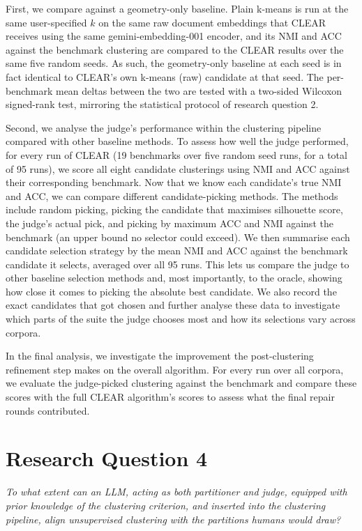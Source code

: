 \documentclass[11pt,a4paper,oneside]{report}
\begin{document}
First, we compare against a geometry-only baseline. Plain k-means is run at the same user-specified $k$ on the same raw document embeddings that CLEAR receives using the same {\small\ttfamily gemini-embedding-001} encoder, and its NMI and ACC against the benchmark clustering are compared to the CLEAR results over the same five random seeds. As such, the geometry-only baseline at each seed is in fact identical to CLEAR's own k-means (raw) candidate at that seed. The per-benchmark mean deltas between the two are tested with a two-sided Wilcoxon signed-rank test, mirroring the statistical protocol of research question 2.

Second, we analyse the judge's performance within the clustering pipeline compared with other baseline methods. To assess how well the judge performed, for every run of CLEAR (19 benchmarks over five random seed runs, for a total of 95 runs), we score all eight candidate clusterings using NMI and ACC against their corresponding benchmark. Now that we know each candidate's true NMI and ACC, we can compare different candidate-picking methods. The methods include random picking, picking the candidate that maximises silhouette score, the judge's actual pick, and picking by maximum ACC and NMI against the benchmark (an upper bound no selector could exceed). We then summarise each candidate selection strategy by the mean NMI and ACC against the benchmark candidate it selects, averaged over all 95 runs. This lets us compare the judge to other baseline selection methods and, most importantly, to the oracle, showing how close it comes to picking the absolute best candidate. We also record the exact candidates that got chosen and further analyse these data to investigate which parts of the suite the judge chooses most and how its selections vary across corpora.

In the final analysis, we investigate the improvement the post-clustering refinement step makes on the overall algorithm. For every run over all corpora, we evaluate the judge-picked clustering against the benchmark and compare these scores with the full CLEAR algorithm's scores to assess what the final repair rounds contributed.

\section{Research Question 4}

\emph{To what extent can an LLM, acting as both partitioner and judge, equipped with prior knowledge of the clustering criterion, and inserted into the clustering pipeline, align unsupervised clustering with the partitions humans would draw?}\\
\end{document}
